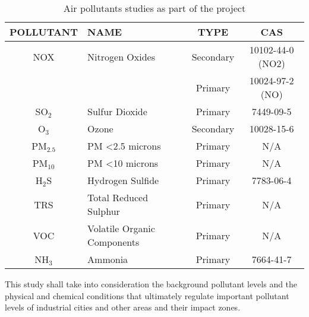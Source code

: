 \begin{table}[H]
\centering
\caption{Air pollutants studies as part of the project}
\label{tab:pollutants}
\begin{tabular}{@{}clcc@{}}
\toprule
\textbf{POLLUTANT} & \textbf{NAME} & \textbf{TYPE} & \textbf{CAS} \\ \midrule
NOX & Nitrogen Oxides & Secondary & 10102-44-0 (NO2) \\
 &  & Primary & 10024-97-2 (NO) \\
SO$_{2}$ & Sulfur Dioxide & Primary & 7449-09-5 \\
O$_{3}$ & Ozone & Secondary & 10028-15-6 \\
PM$_{2.5}$ & PM \textless 2.5 microns & Primary & N/A \\
PM$_{10}$ & PM \textless 10 microns & Primary & N/A \\
H$_{2}$S & Hydrogen Sulfide & Primary & 7783-06-4 \\
TRS & Total Reduced Sulphur & Primary & N/A \\
VOC & Volatile Organic Components & Primary & N/A \\
NH$_{3}$ & Ammonia & Primary & 7664-41-7 \\ \bottomrule
\end{tabular}
\end{table}

This study shall take into consideration the background pollutant levels and the physical and chemical conditions that ultimately regulate important pollutant levels of industrial cities and other areas and their impact zones. 
